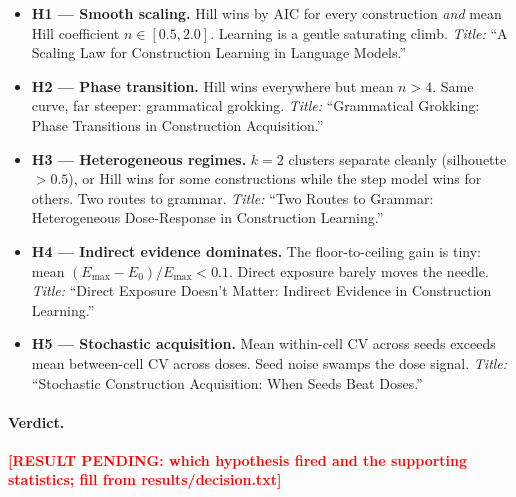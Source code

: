 \documentclass[11pt]{article}
\newcommand{\resultpending}[1]{%
  \textcolor{red}{\textbf{[RESULT PENDING: #1]}}}
\begin{document}
\begin{itemize}
  \item \textbf{H1 --- Smooth scaling.} Hill wins by AIC for every
        construction \emph{and} mean Hill coefficient $n \in [0.5, 2.0]$.
        Learning is a gentle saturating climb.
        \emph{Title:} ``A Scaling Law for Construction Learning in
        Language Models.''
  \item \textbf{H2 --- Phase transition.} Hill wins everywhere but mean
        $n > 4$. Same curve, far steeper: grammatical grokking.
        \emph{Title:} ``Grammatical Grokking: Phase Transitions in
        Construction Acquisition.''
  \item \textbf{H3 --- Heterogeneous regimes.} $k{=}2$ clusters separate
        cleanly (silhouette $> 0.5$), or Hill wins for some constructions
        while the step model wins for others. Two routes to grammar.
        \emph{Title:} ``Two Routes to Grammar: Heterogeneous Dose-Response
        in Construction Learning.''
  \item \textbf{H4 --- Indirect evidence dominates.} The floor-to-ceiling
        gain is tiny: mean $(E_{\max}-E_0)/E_{\max} < 0.1$. Direct exposure
        barely moves the needle.
        \emph{Title:} ``Direct Exposure Doesn't Matter: Indirect Evidence
        in Construction Learning.''
  \item \textbf{H5 --- Stochastic acquisition.} Mean within-cell CV across
        seeds exceeds mean between-cell CV across doses. Seed noise swamps
        the dose signal.
        \emph{Title:} ``Stochastic Construction Acquisition: When Seeds
        Beat Doses.''
\end{itemize}

\paragraph{Verdict.}
\resultpending{which hypothesis fired and the supporting statistics; fill
from results/decision.txt}


\end{document}
